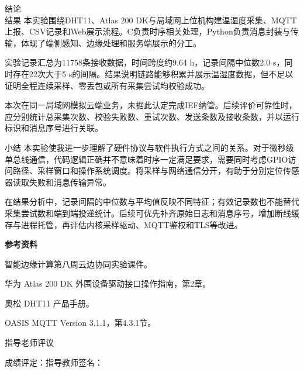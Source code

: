 \documentclass[UTF8,zihao=-4,a4paper]{ctexart}
\newcommand{\rowgap}{\vspace*{0pt}}
\begin{document}
\begin{reprow}{结论\\
结果}
本实验围绕DHT11、Atlas 200 DK与局域网上位机构建温湿度采集、MQTT上报、CSV记录和Web展示流程。C负责时序相关处理，Python负责消息封装与传输，体现了端侧感知、边缘处理和服务端展示的分工。\par

实验记录汇总为11758条接收数据，时间跨度约9.64 h，记录间隔中位数2.0 s，同时存在22次大于5 s的间隔。结果说明链路能够积累并展示温湿度数据，但不足以证明全程连续采样、零丢包或所有采集尝试均校验成功。\par

本次在同一局域网模拟云端业务，未据此认定完成IEF纳管。后续评价可靠性时，应分别统计总采集次数、校验失败数、重试次数、发送条数及接收条数，并以运行标识和消息序号进行关联。\par

\end{reprow}\rowgap

\begin{reprow}{小结}
本实验使我进一步理解了硬件协议与软件执行方式之间的关系。对于微秒级单总线通信，代码逻辑正确并不意味着时序一定满足要求，需要同时考虑GPIO访问路径、采样窗口和操作系统调度。将采样与网络通信分开，有助于分别定位传感器读取失败和消息传输异常。\par

在结果分析中，记录间隔的中位数与平均值反映不同特征；有效记录数也不能替代采集尝试数和端到端投递统计。后续可优先补齐原始日志和消息序号，增加断线缓存与进程托管，再评估内核采样驱动、MQTT鉴权和TLS等改进。\par

\par\medskip
\noindent\textbf{参考资料}\par\nobreak
[1] 智能边缘计算第八周云边协同实验课件。\par
[2] 华为 Atlas 200 DK 外围设备驱动接口操作指南，第2章。\par
[3] 奥松 DHT11 产品手册。\par
[4] OASIS MQTT Version 3.1.1，第4.3.1节。\par

\end{reprow}\rowgap

\begin{reprow}{指导老师评\quad 议}
\vspace*{2.2cm}
\end{reprow}\rowgap
\begin{repfoot}
成绩评定：\hspace{4.2cm}指导教师签名：\hspace{3.0cm}\mbox{}
\end{repfoot}
\end{document}

